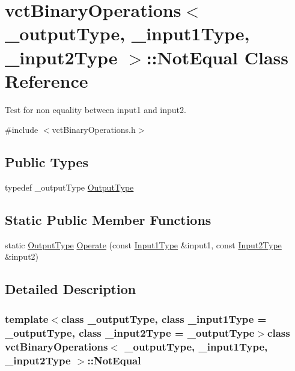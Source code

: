 \hypertarget{classvct_binary_operations_1_1_not_equal}{\section{vct\-Binary\-Operations$<$ \-\_\-output\-Type, \-\_\-input1\-Type, \-\_\-input2\-Type $>$\-:\-:Not\-Equal Class Reference}
\label{classvct_binary_operations_1_1_not_equal}
}


Test for non equality between input1 and input2.  




{\ttfamily \#include $<$vct\-Binary\-Operations.\-h$>$}

\subsection*{Public Types}
\begin{DoxyCompactItemize}
\item 
typedef \-\_\-output\-Type \hyperlink{classvct_binary_operations_1_1_not_equal_a3abb820f974d81c4302dda44cbc5c98b}{Output\-Type}
\end{DoxyCompactItemize}
\subsection*{Static Public Member Functions}
\begin{DoxyCompactItemize}
\item 
static \hyperlink{classvct_binary_operations_1_1_not_equal_a3abb820f974d81c4302dda44cbc5c98b}{Output\-Type} \hyperlink{classvct_binary_operations_1_1_not_equal_a1f77296d252779891e79a67128bedc5b}{Operate} (const \hyperlink{classvct_binary_operations_a5e56a66a012d6a28c539a08a0021c45e}{Input1\-Type} \&input1, const \hyperlink{classvct_binary_operations_a929119af557a04a16b4d854981e49e1b}{Input2\-Type} \&input2)
\end{DoxyCompactItemize}


\subsection{Detailed Description}
\subsubsection*{template$<$class \-\_\-output\-Type, class \-\_\-input1\-Type = \-\_\-output\-Type, class \-\_\-input2\-Type = \-\_\-output\-Type$>$class vct\-Binary\-Operations$<$ \-\_\-output\-Type, \-\_\-input1\-Type, \-\_\-input2\-Type $>$\-::\-Not\-Equal}

